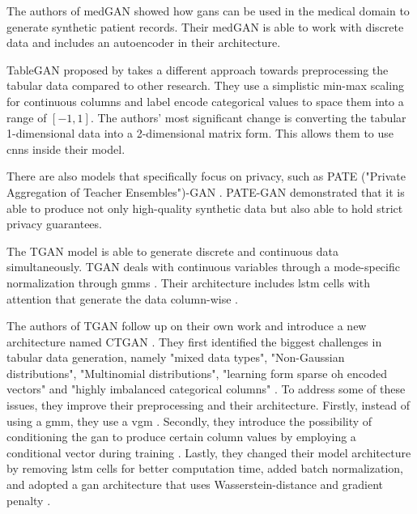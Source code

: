 The authors of medGAN \cite{choi2017GeneratingMultilabelDiscrete} showed how \glspl{gan} can be used in the medical domain to generate synthetic patient records.
Their medGAN is able to work with discrete data and includes an autoencoder in their architecture.

TableGAN proposed by \cite{park2018DataSynthesisBased} takes a different approach towards preprocessing the tabular data compared to other research.
They use a simplistic min-max scaling for continuous columns and label encode categorical values to space them into a range of $[-1, 1]$.
The authors' most significant change is converting the tabular 1-dimensional data into a 2-dimensional matrix form.
This allows them to use \glspl{cnn} inside their model.

There are also models that specifically focus on privacy, such as PATE ("Private Aggregation of Teacher Ensembles")-GAN  \cite{jordon2018PATEGANGeneratingSynthetic}.
PATE-GAN demonstrated that it is able to produce not only high-quality synthetic data but also able to hold strict privacy guarantees.

The TGAN \cite{xu2018SynthesizingTabularData} model is able to generate discrete and continuous data simultaneously.
TGAN deals with continuous variables through a mode-specific normalization through \glspl{gmm} \cite[p. 3]{xu2018SynthesizingTabularData}.
Their architecture includes \gls{lstm} cells with attention that generate the data column-wise \cite{xu2018SynthesizingTabularData}.

The authors of TGAN follow up on their own work and introduce a new architecture named CTGAN \cite{xu2019ModelingTabularData}.
They first identified the biggest challenges in tabular data generation, namely "mixed data types", "Non-Gaussian distributions", "Multinomial distributions", "learning form sparse \gls{oh} encoded vectors" and "highly imbalanced categorical columns" \cite[p. 3]{xu2019ModelingTabularData}.
To address some of these issues, they improve their preprocessing and their architecture.
Firstly, instead of using a \gls{gmm}, they use a \gls{vgm} \cite{xu2019ModelingTabularData}.
Secondly, they introduce the possibility of conditioning the \gls{gan} to produce certain column values by employing a conditional vector during training \cite{xu2019ModelingTabularData}.
Lastly, they changed their model architecture by removing \gls{lstm} cells for better computation time, added batch normalization, 
and adopted a \gls{gan} architecture that uses Wasserstein-distance and gradient penalty \cite{gulrajani2017ImprovedTrainingWasserstein}.

